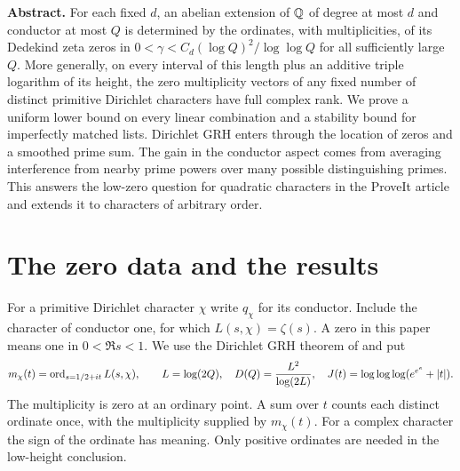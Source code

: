 \documentclass[11pt]{article}
\begin{document}
\thispagestyle{plain}
\vspace{12pt}

\vspace{5pt}
\vspace{12pt}

\noindent\textbf{Abstract.}
For each fixed \(d\), an abelian extension of \(\mathbb Q\) of degree at most \(d\) and conductor at most \(Q\) is determined by the ordinates, with multiplicities, of its Dedekind zeta zeros in
\(0<\gamma<C_d(\log Q)^2/\log\log Q\) for all sufficiently large \(Q\).
More generally, on every interval of this length plus an additive triple logarithm of its height, the zero multiplicity vectors of any fixed number of distinct primitive Dirichlet characters have full complex rank. We prove a uniform lower bound on every linear combination and a stability bound for imperfectly matched lists. Dirichlet GRH enters through the location of zeros and a smoothed prime sum. The gain in the conductor aspect comes from averaging interference from nearby prime powers over many possible distinguishing primes. This answers the low-zero question for quadratic characters in the ProveIt article and extends it to characters of arbitrary order.

\section{The zero data and the results}
For a primitive Dirichlet character \(\chi\) write \(q_\chi\) for its conductor. Include the character of conductor one, for which \(L(s,\chi)=\zeta(s)\). A zero in this paper means one in \(0<\Re s<1\). We use the Dirichlet GRH theorem of \cite{lean} and put
\[
 m_\chi(t)=\operatorname{ord}_{s=1/2+it} L(s,\chi),\qquad
 L=\log(2Q),\quad D(Q)=\frac{L^2}{\log(2L)},\quad
 J(t)=\log\log\log(e^{e^e}+|t|).
\]
The multiplicity is zero at an ordinary point. A sum over \(t\) counts each distinct ordinate once, with the multiplicity supplied by \(m_\chi(t)\). For a complex character the sign of the ordinate has meaning. Only positive ordinates are needed in the low-height conclusion.
\end{document}

